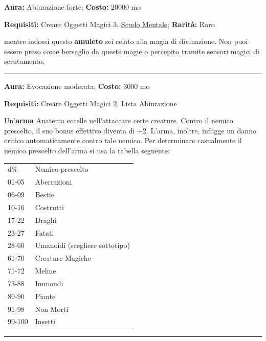 \begin{multicols}{2}
\textbf{Aura:} Abiurazione forte; \textbf{Costo:} 20000 mo

\textbf{Requisiti:} Creare Oggetti Magici 3, \hyperlink{AnellodelloScudoMentale}{Scudo Mentale}; \textbf{Rarità:} Raro

mentre indossi questo \textbf{amuleto} sei celato alla magia di divinazione. Non puoi essere preso come bersaglio da queste magie o percepito tramite sensori magici di scrutamento.

\smallskip\noindent\rule{\linewidth}{2pt}  \hypertarget{armaAnatema}{}\smallskip{}\noindent\label{armaAnatema}

\textbf{Aura:} Evocazione moderata; \textbf{Costo:} 3000 mo

\textbf{Requisiti:} Creare Oggetti Magici 2, Lista Abiurazione

Un'\textbf{arma} Anatema eccelle nell'attaccare certe creature. Contro il nemico prescelto, il suo bonus effettivo diventa di +2. L'arma, inoltre, infligge un danno critico automaticamente contro tale nemico. Per determinare casualmente il nemico prescelto dell'arma si usa la tabella seguente:

\medskip

\begin{tabular}{ll}
d\% &Nemico prescelto\\
01-05 &Aberrazioni\\
06-09 &Bestie\\
10-16 &Costrutti\\
17-22 &Draghi\\
23-27 &Fatati\\
28-60 &Umanoidi (scegliere sottotipo)\\
61-70 &Creature Magiche\\
71-72 &Melme\\
73-88 &Immondi\\
89-90 &Piante\\
91-98 &Non Morti\\
99-100 &Insetti
\end{tabular}

\medskip

\smallskip\noindent\rule{\linewidth}{2pt}  \hypertarget{AnelloAccumulaIncantesimi}{}\smallskip{}\noindent\label{AnelloAccumulaIncantesimi}


\end{multicols}
